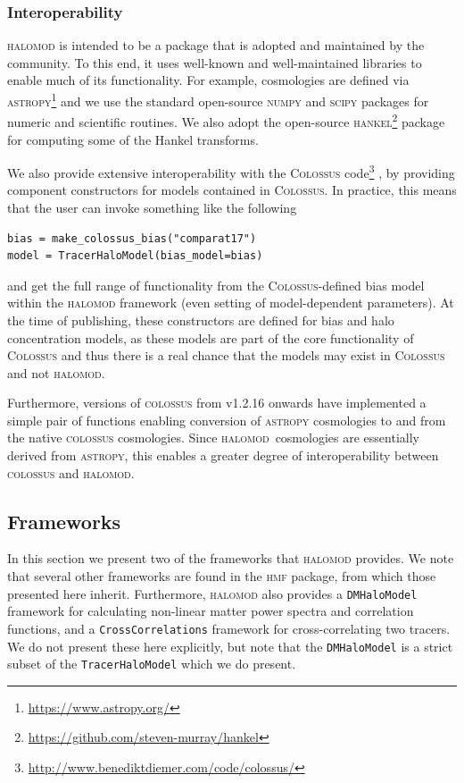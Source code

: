 \documentclass[5p,aas_macros]{elsarticle}
\newcommand{\halomod}{\textsc{halomod}}
\newcommand{\component}{\texttt{Component}}
\begin{document}

\subsubsection{Interoperability}
\textsc{halomod} is intended to be a package that is adopted and maintained by the community. To this end, it uses well-known and well-maintained libraries to enable much of its functionality. 
For example, cosmologies are defined via \textsc{astropy}\footnote{\url{https://www.astropy.org/}} and we use the standard open-source \textsc{numpy} and \textsc{scipy} packages for numeric and scientific routines. 
We also adopt the open-source \textsc{hankel}\footnote{\url{https://github.com/steven-murray/hankel}} \citep{Murray2019} package for computing some of the Hankel transforms.

We also provide extensive interoperability with the \textsc{Colossus} code\footnote{\url{http://www.benediktdiemer.com/code/colossus/}} \citep{Diemer2018}, by providing component constructors for models contained in \textsc{Colossus}. 
In practice, this means that the user can invoke something like the following
\begin{verbatim}
bias = make_colossus_bias("comparat17")
model = TracerHaloModel(bias_model=bias)
\end{verbatim}
and get the full range of functionality from the \textsc{Colossus}-defined bias model within the \textsc{halomod} framework (even setting of model-dependent parameters).
At the time of publishing, these constructors are defined for bias and halo concentration models, as these models are part of the core functionality of \textsc{Colossus} and thus there is a real chance that the models may exist in \textsc{Colossus} and not \textsc{halomod}. 

Furthermore, versions of \textsc{colossus} from v1.2.16 onwards have implemented a simple pair of functions enabling conversion of \textsc{astropy} cosmologies to and from the native \textsc{colossus} cosmologies. 
Since \halomod\ cosmologies are essentially derived from \textsc{astropy}, this enables a greater degree of interoperability between \textsc{colossus}
 and \halomod.
 
\subsection{Frameworks}
\label{sec:halomod:frameworks}
In this section we present two of the frameworks that \textsc{halomod} provides. We note that several other frameworks are found in the \textsc{hmf} package, from which those presented here inherit. Furthermore, \textsc{halomod} also provides a \verb|DMHaloModel| framework for calculating non-linear matter power spectra and correlation functions, and a \texttt{Cross\-Correlations} framework for cross-correlating two tracers. We do not present these here explicitly, but note that the \verb|DMHaloModel| is a strict subset of the \verb|TracerHaloModel| which we do present.
\end{document}
